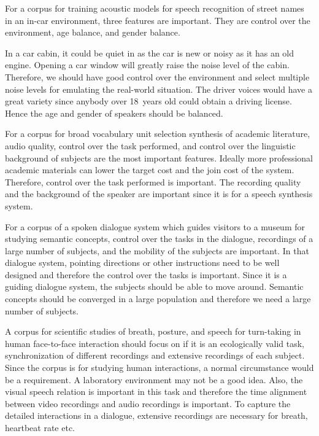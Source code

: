 \documentclass[12pt]{article}
\newenvironment{problem}[2][Problem]{\begin{trivlist}
\item[\hskip \labelsep {\bfseries #1}\hskip \labelsep {\bfseries #2.}]}{\end{trivlist}}
\begin{document}
\begin{problem}{4.3}
    For a corpus for training acoustic models for speech recognition of street 
    names in an in-car environment, three features are important. 
    They are control over the environment, age balance, and gender balance.

    In a car cabin, it could be quiet in as the car is new or noisy as it has an
    old engine.
    Opening a car window will greatly raise the noise level of the cabin. 
    Therefore, we should have good control over the environment and select 
    multiple noise levels for emulating the real-world situation. 
    The driver voices would have a great variety since anybody over 18 years old 
    could obtain a driving license. 
    Hence the age and gender of speakers should be balanced.

    For a corpus for broad vocabulary unit selection synthesis of academic literature, 
    audio quality, control over the task performed, and control over the linguistic 
    background of subjects are the most important features.  
    Ideally more professional academic materials can lower the target cost and 
    the join cost of the system. 
    Therefore, control over the task performed is important. 
    The recording quality and the background of the speaker are important 
    since it is for a speech synthesis system.
   
    For a corpus of a spoken dialogue system which guides visitors to a museum 
    for studying semantic concepts, control over the tasks in the dialogue, 
    recordings of a large number of subjects, and the mobility of the subjects 
    are important. 
    In that dialogue system, pointing directions or other instructions need to 
    be well designed and therefore the control over the tasks is important.
    Since it is a guiding dialogue system, the subjects should be able to move 
    around. 
    Semantic concepts should be converged in a large population and 
    therefore we need a large number of subjects. 

    A corpus for scientific studies of breath, posture, and speech for turn-taking
    in human face-to-face interaction should focus on if it is an ecologically 
    valid task, synchronization of different recordings and extensive 
    recordings of each subject.
    Since the corpus is for studying human interactions, a normal circumstance 
    would be a requirement. 
    A laboratory environment may not be a good idea.
    Also, the visual speech relation is important in this task and therefore
    the time alignment between video recordings and audio recordings is important. 
    To capture the detailed interactions in a dialogue, extensive recordings are
    necessary for breath, heartbeat rate etc.
\end{problem}
\pagebreak
\end{document}
